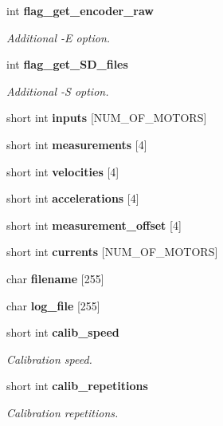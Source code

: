 \begin{DoxyCompactItemize}
\mbox{\label{structglobal__args_a164f166bb4586e4027b8daf4cb01ff6d}} 
int \textbf{ flag\+\_\+get\+\_\+encoder\+\_\+raw}
\begin{DoxyCompactList}\small\item\em Additional -\/E option. \end{DoxyCompactList}\item 
\mbox{\label{structglobal__args_a719195fe3d00020f463f848ecd4c6aee}} 
int \textbf{ flag\+\_\+get\+\_\+\+S\+D\+\_\+files}
\begin{DoxyCompactList}\small\item\em Additional -\/S option. \end{DoxyCompactList}\item 
\mbox{\label{structglobal__args_a5c5d83977377b63e3671b52680be11aa}} 
short int {\bfseries inputs} [N\+U\+M\+\_\+\+O\+F\+\_\+\+M\+O\+T\+O\+RS]
\item 
\mbox{\label{structglobal__args_a4c65d251aa919a9ae56d11639a748ccf}} 
short int {\bfseries measurements} [4]
\item 
\mbox{\label{structglobal__args_aa064f75f1bb48d252dabea993cd8c393}} 
short int {\bfseries velocities} [4]
\item 
\mbox{\label{structglobal__args_a6fe131122f89735be8fb030f8333e8c8}} 
short int {\bfseries accelerations} [4]
\item 
\mbox{\label{structglobal__args_a8e63e8b1dcf1ee3b6429110e26a7ef3d}} 
short int {\bfseries measurement\+\_\+offset} [4]
\item 
\mbox{\label{structglobal__args_aff0783d0bf2ae80eadc0c85a84db1549}} 
short int {\bfseries currents} [N\+U\+M\+\_\+\+O\+F\+\_\+\+M\+O\+T\+O\+RS]
\item 
\mbox{\label{structglobal__args_a522de19291f23fb0be3eb346cc1957e9}} 
char {\bfseries filename} [255]
\item 
\mbox{\label{structglobal__args_ad0345d4821606480fcb0e28327340660}} 
char {\bfseries log\+\_\+file} [255]
\item 
\mbox{\label{structglobal__args_a74aee2224894f2773538b376bcdd3a65}} 
short int \textbf{ calib\+\_\+speed}
\begin{DoxyCompactList}\small\item\em Calibration speed. \end{DoxyCompactList}\item 
\mbox{\label{structglobal__args_a97358fe57110982e565254fa7310cf8f}} 
short int \textbf{ calib\+\_\+repetitions}
\begin{DoxyCompactList}\small\item\em Calibration repetitions. \end{DoxyCompactList}\item 

\end{DoxyCompactItemize}
